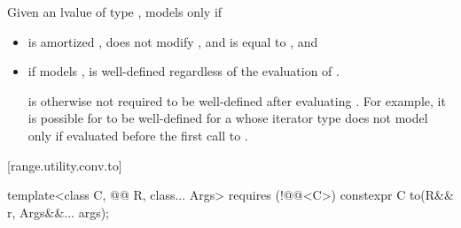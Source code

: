 \documentclass{wg21}
\begin{document}
\begin{itemdescr}
    \pnum
    Given an lvalue  of type , 
    models  only if
    \begin{itemize}
        \item {} is amortized , does not modify ,
        and is equal to , and

        \item if  models ,
         is well-defined regardless of the evaluation of
        .
        \begin{note}
             is otherwise not required to be
            well-defined after evaluating .
            For example, it is possible for  to be well-defined
            for a  whose iterator type
            does not model 
            only if evaluated before the first call to .
        \end{note}
    \end{itemize}
\end{itemdescr}


[range.utility.conv.to]{}

%
\begin{itemdecl}
    template<class C, @@ R, class... Args> requires (!@@<C>)
    constexpr C to(R&& r, Args&&... args);
\end{itemdecl}
\end{document}
